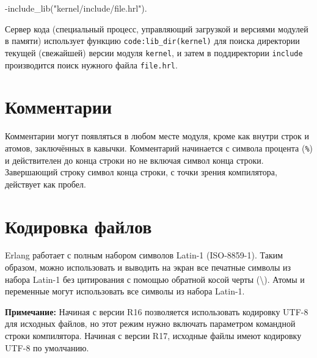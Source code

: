 \begin{erlang}
-include_lib("kernel/include/file.hrl").
\end{erlang}

Сервер кода (специальный процесс, управляющий загрузкой и версиями модулей в 
памяти) использует функцию \texttt{code:lib\_dir(kernel)} для поиска директории
текущей (свежайшей) версии модуля \texttt{kernel}, и затем в поддиректории
\texttt{include} производится поиск нужного файла \texttt{file.hrl}.



\section{Комментарии}

Комментарии могут появляться в любом месте модуля, кроме как внутри строк и 
атомов, заключённых в кавычки. Комментарий начинается с символа процента
(\texttt{\%}) и действителен до конца строки но не включая символ конца строки.
Завершающий строку символ конца строки, с точки зрения компилятора, действует
как пробел.



\section{Кодировка файлов}

Erlang работает с полным набором символов Latin-1 (ISO-8859-1). Таким образом, 
можно использовать и выводить на экран все печатные символы из набора Latin-1 
без цитирования с помощью обратной косой черты (\textbackslash{}). Атомы и
переменные могут использовать все символы из набора Latin-1.

\textbf{Примечание:} Начиная с версии R16 позволяется использовать кодировку 
UTF-8 для исходных файлов, но этот режим нужно включать параметром командной
строки компилятора. Начиная с версии R17, исходные файлы имеют кодировку UTF-8
по умолчанию.

